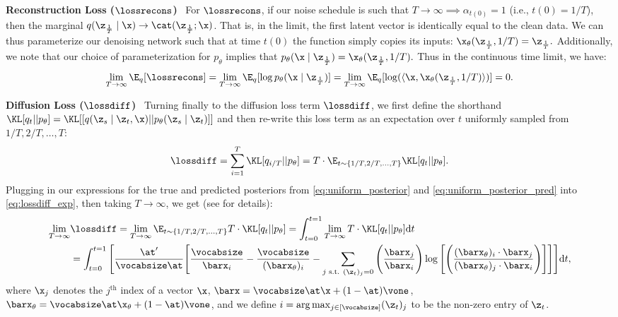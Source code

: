 \documentclass{article} %
\begin{document}
\textbf{Reconstruction Loss ($\lossrecons$)}~
For $\lossrecons$, if our noise schedule is such that  $T \rightarrow \infty \implies \alpha_{t(0)} = 1$ (i.e., $t(0)=1/T$), then the marginal $q(\z_{\frac{1}{T}} \mid \x) \rightarrow \cat(\z_{\frac{1}{T}}; \x)$.
That is, in the limit, the first latent vector is identically equal to the clean data.
We can thus parameterize our denoising network such that at time $t(0)$ the function simply copies its inputs: $\x_\theta(\z_{\frac{1}{T}}, 1/T) = \z_{\frac{1}{T}}.$
Additionally, we note that our choice of parameterization for $p_\theta$ implies that $p_\theta(\x \mid \z_{{\frac{1}{T}}}) = \x_\theta(\z_{{\frac{1}{T}}}, 1/T).$
Thus in the continuous time limit, we have:
\begin{equation*}
    \lim_{T\rightarrow\infty}\E_q[\lossrecons] = \lim_{T\rightarrow\infty}\E_q[\log p_\theta(\x\mid\z_{\frac{1}{T}})]
    = \lim_{T\rightarrow\infty}\E_q[\log(\langle\x, \x_\theta(\z_{\frac{1}{T}}, 1/T)\rangle)] = 0.
\end{equation*}

\textbf{Diffusion Loss ($\lossdiff$)}~
Turning finally to the diffusion loss term $\lossdiff$, we first define the shorthand $\KL[q_t||p_\theta] = \KL[[q(\z_{s} \mid \z_{t}, \x) || p_\theta(\z_{s}\mid \z_{t})]]$ and then re-write this loss term as an expectation over $t$ uniformly sampled from $1/T, 2/T, \ldots, T$:
\begin{equation}\label{eq:lossdiff_exp}
    \lossdiff = \sum_{i=1}^T\KL[q_{i/T}|| p_\theta]= T\cdot\E_{t\sim\{1/T, 2/T, \ldots, T\}}\KL[q_{t}|| p_\theta].
\end{equation}
Plugging in our expressions for the true and predicted posteriors from \eqref{eq:uniform_posterior} and \eqref{eq:uniform_posterior_pred} into 
\eqref{eq:lossdiff_exp}, then taking $T\rightarrow \infty$, we get (see  for details):
\begin{equation}\label{eq:udlm_diff}
\begin{split}
    \lim_{T\rightarrow\infty}&\lossdiff =
    \lim_{T\rightarrow\infty}\E_{t\sim\{1/T, 2/T, \ldots, T\}}T\cdot\KL[q_t|| p_\theta] = \int_{t=0}^{t=1}\lim_{T\rightarrow\infty}T\cdot\KL[q_t||p_\theta]\mathrm{d}t
    \\
    &= \int_{t=0}^{t=1}\Bigg[
    \frac{\at'}{\vocabsize\at}\Bigg[\frac{\vocabsize}{\barx_i} - \frac{\vocabsize}{(\barx_\theta)_i} -\sum_{\substack{j \text{ s.t. }(\z_t)_j = 0}} \Bigg(\frac{\barx_j}{\barx_i}\Bigg) \log\Bigg[\Bigg(\frac{(\barx_\theta)_i\cdot\barx_j}{(\barx_\theta)_j\cdot\barx_i}\Bigg)\Bigg]
    \Bigg]\Bigg]\mathrm{d}t,
\end{split}
\end{equation}
where $\x_j$ denotes the $j^{\text{th}}$ index of a vector $\x$, $\barx = \vocabsize\at\x + (1 - \at)\vone$, $\barx_\theta = \vocabsize\at\x_\theta + (1 - \at)\vone$, and we define $i = \arg\max_{j\in[\vocabsize]} (\z_t)_j$ to be the non-zero entry of $\z_t$.
\end{document}

